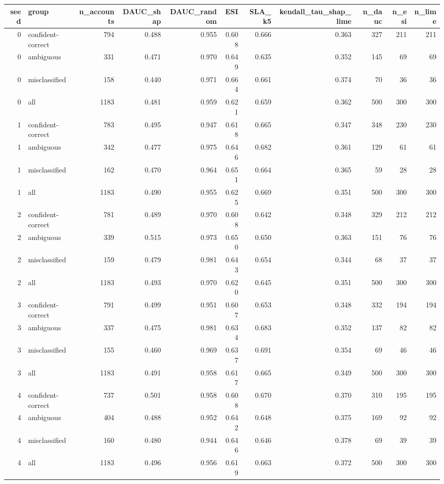 \begin{tabular}{rlrrrrrrrrr}
\toprule
seed & group & n_accounts & DAUC_shap & DAUC_random & ESI & SLA_k5 & kendall_tau_shap_lime & n_dauc & n_esi & n_lime \\
\midrule
0 & confident-correct & 794 & 0.488 & 0.955 & 0.608 & 0.666 & 0.363 & 327 & 211 & 211 \\
0 & ambiguous & 331 & 0.471 & 0.970 & 0.649 & 0.635 & 0.352 & 145 & 69 & 69 \\
0 & misclassified & 158 & 0.440 & 0.971 & 0.664 & 0.661 & 0.374 & 70 & 36 & 36 \\
0 & all & 1183 & 0.481 & 0.959 & 0.621 & 0.659 & 0.362 & 500 & 300 & 300 \\
1 & confident-correct & 783 & 0.495 & 0.947 & 0.618 & 0.665 & 0.347 & 348 & 230 & 230 \\
1 & ambiguous & 342 & 0.477 & 0.975 & 0.646 & 0.682 & 0.361 & 129 & 61 & 61 \\
1 & misclassified & 162 & 0.470 & 0.964 & 0.651 & 0.664 & 0.365 & 59 & 28 & 28 \\
1 & all & 1183 & 0.490 & 0.955 & 0.625 & 0.669 & 0.351 & 500 & 300 & 300 \\
2 & confident-correct & 781 & 0.489 & 0.970 & 0.608 & 0.642 & 0.348 & 329 & 212 & 212 \\
2 & ambiguous & 339 & 0.515 & 0.973 & 0.650 & 0.650 & 0.363 & 151 & 76 & 76 \\
2 & misclassified & 159 & 0.479 & 0.981 & 0.643 & 0.654 & 0.344 & 68 & 37 & 37 \\
2 & all & 1183 & 0.493 & 0.970 & 0.620 & 0.645 & 0.351 & 500 & 300 & 300 \\
3 & confident-correct & 791 & 0.499 & 0.951 & 0.607 & 0.653 & 0.348 & 332 & 194 & 194 \\
3 & ambiguous & 337 & 0.475 & 0.981 & 0.634 & 0.683 & 0.352 & 137 & 82 & 82 \\
3 & misclassified & 155 & 0.460 & 0.969 & 0.637 & 0.691 & 0.354 & 69 & 46 & 46 \\
3 & all & 1183 & 0.491 & 0.958 & 0.617 & 0.665 & 0.349 & 500 & 300 & 300 \\
4 & confident-correct & 737 & 0.501 & 0.958 & 0.608 & 0.670 & 0.370 & 310 & 195 & 195 \\
4 & ambiguous & 404 & 0.488 & 0.952 & 0.642 & 0.648 & 0.375 & 169 & 92 & 92 \\
4 & misclassified & 160 & 0.480 & 0.944 & 0.646 & 0.646 & 0.378 & 69 & 39 & 39 \\
4 & all & 1183 & 0.496 & 0.956 & 0.619 & 0.663 & 0.372 & 500 & 300 & 300 \\
\bottomrule
\end{tabular}
